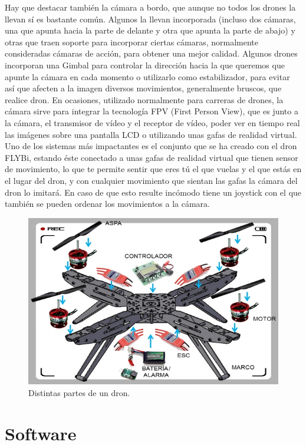 Hay que destacar también la cámara a bordo, que aunque no todos los drones la llevan sí es bastante común. Algunos la llevan incorporada (incluso dos cámaras, una que apunta hacia la parte de delante y otra que apunta la parte de abajo) y otras que traen soporte para incorporar ciertas cámaras, normalmente consideradas cámaras de acción, para obtener una mejor calidad. Algunos drones incorporan una Gimbal para controlar la dirección hacia la que queremos que apunte la cámara en cada momento o utilizarlo como estabilizador, para evitar así que afecten a la imagen diversos movimientos, generalmente bruscos, que realice dron. En ocasiones, utilizado normalmente para carreras de drones, la cámara sirve para integrar la tecnología FPV (First Person View), que es junto a la cámara, el transmisor de vídeo y el receptor de vídeo, poder ver en tiempo real las imágenes sobre una pantalla LCD o utilizando unas gafas de realidad virtual. Uno de los sistemas más impactantes es el conjunto que se ha creado con el dron FLYBi, estando éste conectado a unas gafas de realidad virtual que tienen sensor de movimiento, lo que te permite sentir que eres tú el que vuelas y el que estás en el lugar del dron, y con cualquier movimiento que sientan las gafas la cámara del dron lo imitará. En caso de que esto resulte incómodo tiene un joystick con el que también se pueden ordenar los movimientos a la cámara.

\begin{figure}[H]
  \centering
  \includegraphics[scale=0.8]{imagenes/partesdron.jpg}
  \caption{Distintas partes de un dron.}
  \label{fig:gnat}
\end{figure}

\section{Software}

